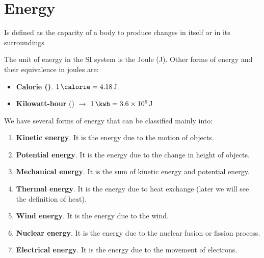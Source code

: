 


\section{Energy}
\begin{definition}[Energy]
    Is defined as the capacity of a body to produce changes in itself or in its surroundings
\end{definition}
The unit of energy in the SI system is the Joule (\unit{\joule}). Other forms of energy and their equivalence in joules are:
\begin{itemize}
    \item \textbf{Calorie (\unit{\calorie})}. \( \qty{1}{\calorie} = \qty{4.18}{\joule} \).
    \item \textbf{Kilowatt-hour} (\unit{\kwh}) \( \longrightarrow \) \( \qty{1}{\kwh} = \qty{3.6e6}{\joule} \)
\end{itemize}
We have several forms of energy that can be classified mainly into:
\begin{enumerate}[label=\letraminuscula]
        \item \textbf{Kinetic energy}.
        It is the energy due to the motion of objects.
        \item \textbf{Potential energy}.
        It is the energy due to the change in height of objects.
        \item \textbf{Mechanical energy}.
        It is the sum of kinetic energy and potential energy.
        \item \textbf{Thermal energy}.
        It is the energy due to heat exchange (later we will see the definition of heat).
        \item \textbf{Wind energy}.
        It is the energy due to the wind.
        \item \textbf{Nuclear energy}.
        It is the energy due to the nuclear fusion or fission process.
        \item \textbf{Electrical energy}.
        It is the energy due to the movement of electrons.
\end{enumerate}


